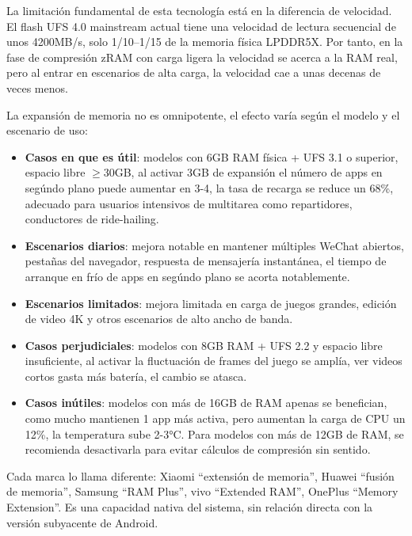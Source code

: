 
La limitación fundamental de esta tecnología está en la diferencia de velocidad. El flash UFS 4.0 mainstream actual tiene una velocidad de lectura secuencial de unos 4200MB/s, solo 1/10–1/15 de la memoria física LPDDR5X. Por tanto, en la fase de compresión zRAM con carga ligera la velocidad se acerca a la RAM real, pero al entrar en escenarios de alta carga, la velocidad cae a unas decenas de veces menos.


La expansión de memoria no es omnipotente, el efecto varía según el modelo y el escenario de uso:

\begin{itemize}
  \item \textbf{Casos en que es útil}: modelos con 6GB RAM física + UFS 3.1 o superior, espacio libre $\geq$30GB, al activar 3GB de expansión el número de apps en segúndo plano puede aumentar en 3-4, la tasa de recarga se reduce un 68\%, adecuado para usuarios intensivos de multitarea como repartidores, conductores de ride-hailing.
  \item \textbf{Escenarios diarios}: mejora notable en mantener múltiples WeChat abiertos, pestañas del navegador, respuesta de mensajería instantánea, el tiempo de arranque en frío de apps en segúndo plano se acorta notablemente.
  \item \textbf{Escenarios limitados}: mejora limitada en carga de juegos grandes, edición de video 4K y otros escenarios de alto ancho de banda.
  \item \textbf{Casos perjudiciales}: modelos con 8GB RAM + UFS 2.2 y espacio libre insuficiente, al activar la fluctuación de frames del juego se amplía, ver videos cortos gasta más batería, el cambio se atasca.
  \item \textbf{Casos inútiles}: modelos con más de 16GB de RAM apenas se benefician, como mucho mantienen 1 app más activa, pero aumentan la carga de CPU un 12\%, la temperatura sube 2-3°C. Para modelos con más de 12GB de RAM, se recomienda desactivarla para evitar cálculos de compresión sin sentido.
\end{itemize}


Cada marca lo llama diferente: Xiaomi “extensión de memoria”, Huawei “fusión de memoria”, Samsung “RAM Plus”, vivo “Extended RAM”, OnePlus “Memory Extension”. Es una capacidad nativa del sistema, sin relación directa con la versión subyacente de Android.

